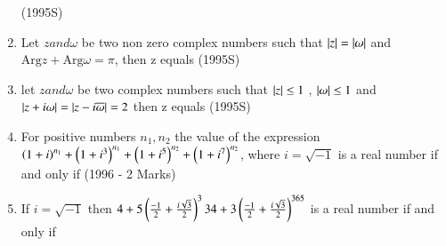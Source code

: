 \documentclass[journal,12pt,twocolumn]{IEEEtran}
\theoremstyle{remark}
\begin{document}
\begin{enumerate}[start=6]
\hfill{(1995S)}
\begin{enumerate}
\end{enumerate}
\item Let $z and \omega$ be two non zero complex numbers such that $\left\vert z\right\vert=\left\vert\omega\right\vert$ and $\mathrm{Arg}z+\mathrm{Arg}\omega=\pi$, then z equals 
\hfill{(1995S)}
\begin{enumerate}
\end{enumerate}
\item let $z and \omega$ be two complex numbers such that $\left\vert z\right\vert\leq1$ , $\left\vert\omega\right\vert\leq1$ and $\left\vert z+i\omega\right\vert=\left\vert z-i\overline{\omega}\right\vert=2$ then z equals 
\hfill{(1995S)}
\begin{enumerate}
\end{enumerate}
\item For positive numbers $n_1,n_2$ the value of the expression $\left(1+i\right)^{n_1}+\left(1+i^3\right)^{n_1}+\left(1+i^5\right)^{n_2}+\left(1+i^7\right)^{n_2}$, where $i=\sqrt{-1}$ is a real number if and only if
\hfill{(1996 - 2 Marks)}
\begin{enumerate}
\end{enumerate}
\item If $i=\sqrt{-1}$ then $4+5\left(\frac{-1}{2}+\frac{i\sqrt{3}}{2}\right)^334 + 3\left(\frac{-1}{2}+\frac{i\sqrt{3}}{2}\right)^{365}$ is a real number if and only if 

\end{enumerate}
\end{document}
